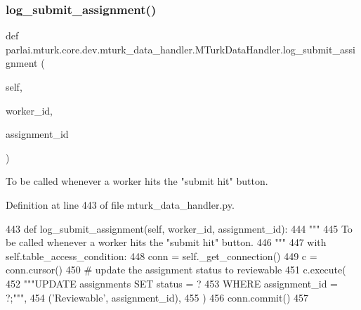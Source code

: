 \subsubsection{\texorpdfstring{log\+\_\+submit\+\_\+assignment()}{log\_submit\_assignment()}}
{\footnotesize\ttfamily def parlai.\+mturk.\+core.\+dev.\+mturk\+\_\+data\+\_\+handler.\+M\+Turk\+Data\+Handler.\+log\+\_\+submit\+\_\+assignment (\begin{DoxyParamCaption}\item[{}]{self,  }\item[{}]{worker\+\_\+id,  }\item[{}]{assignment\+\_\+id }\end{DoxyParamCaption})}

\begin{DoxyVerb}To be called whenever a worker hits the "submit hit" button.
\end{DoxyVerb}
 

Definition at line 443 of file mturk\+\_\+data\+\_\+handler.\+py.


\begin{DoxyCode}
443     \textcolor{keyword}{def }log\_submit\_assignment(self, worker\_id, assignment\_id):
444         \textcolor{stringliteral}{"""}
445 \textcolor{stringliteral}{        To be called whenever a worker hits the "submit hit" button.}
446 \textcolor{stringliteral}{        """}
447         with self.table\_access\_condition:
448             conn = self.\_get\_connection()
449             c = conn.cursor()
450             \textcolor{comment}{# update the assignment status to reviewable}
451             c.execute(
452                 \textcolor{stringliteral}{"""UPDATE assignments SET status = ?}
453 \textcolor{stringliteral}{                         WHERE assignment\_id = ?;"""},
454                 (\textcolor{stringliteral}{'Reviewable'}, assignment\_id),
455             )
456             conn.commit()
457 
\end{DoxyCode}
\mbox{\label{classparlai_1_1mturk_1_1core_1_1dev_1_1mturk__data__handler_1_1MTurkDataHandler_a7b7b243f1ae901dce38b639fb9dcde22}} 
